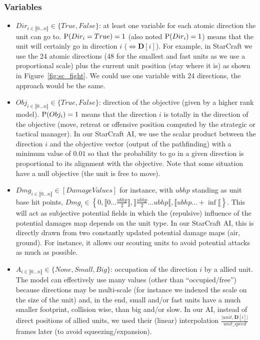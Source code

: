 \subsubsection{Variables}
\begin{itemize}
\item $Dir_{i \in \llbracket 0 \dots n\rrbracket } \in \{True, False\}$: at least one variable for each atomic direction the unit can go to. $\mathrm{P}(Dir_i = True) = 1$ (also noted $\mathrm{P}(Dir_i) = 1$) means that the unit will certainly go in direction $i$ ($\Leftrightarrow \mathbf{D}[i]$). For example, in StarCraft we use the 24 atomic directions (48 for the smallest and fast units as we use a proportional scale) plus the current unit position (stay where it is) as shown in Figure~\ref{fig:sc_fight}. We could use one variable with 24 directions, the approach would be the same. %
\item $Obj_{i \in \llbracket 0 \dots n\rrbracket } \in \{True, False\}$: direction of the objective (given by a higher rank model). $\mathrm{P}(Obj_i) = 1$ means that the direction $i$ is totally in the direction of the objective (move, retreat or offensive position computed by the strategic or tactical manager). In our StarCraft AI, we use the scalar product between the direction $i$ and the objective vector (output of the pathfinding) with a minimum value of $0.01$ so that the probability to go in a given direction is proportional to its alignment with the objective. Note that some situation have a null objective (the unit is free to move).
\item $Dmg_{i \in \llbracket 0 \dots n\rrbracket } \in [Damage Values]$ for instance, with $ubhp$ standing as unit base hit points, $Dmg_i \in \left\{0, \llbracket 0\dots \frac{ubhp}{2}\rrbracket, \rrbracket \frac{ubhp}{2} \dots ubhp\llbracket, \llbracket ubhp \dots +\inf\llbracket \right\}$. This will act as subjective potential fields \citep{Hagelback2009} in which the (repulsive) influence of the potential damages map depends on the unit type. In our StarCraft AI, this is directly drawn from two constantly updated potential damage maps (air, ground). For instance, it allows our scouting units to avoid potential attacks as much as possible.
\item $A_{i \in \llbracket 0 \dots n\rrbracket } \in \{None, Small, Big\}$: occupation of the direction $i$ by a allied unit. The model can effectively use many values (other than ``occupied/free'') because directions may be multi-scale (for instance we indexed the scale on the size of the unit) and, in the end, small and/or fast units have a much smaller footprint, collision wise, than big and/or slow. In our AI, instead of direct positions of allied units, we used their (linear) interpolation $\frac{\mathbf{|}unit, \mathbf{D}[i]\mathbf{|}}{unit\_speed}$ frames later (to avoid squeezing/expansion).

\end{itemize}
